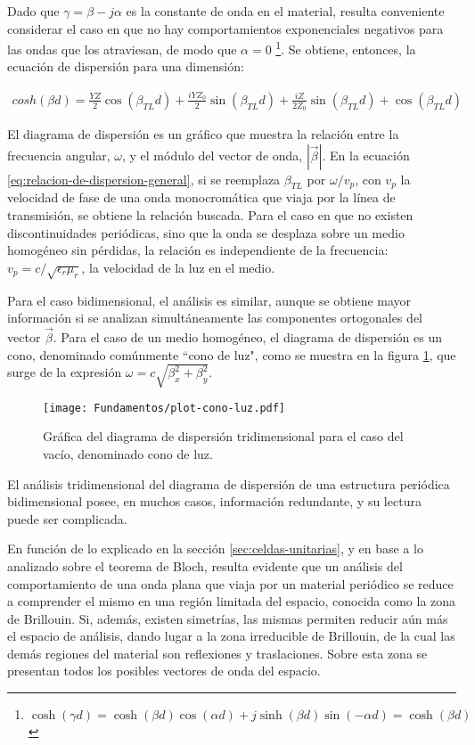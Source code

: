 Dado que $\gamma = \beta -j\alpha$ es la constante de onda en el material, resulta conveniente considerar el caso en que no hay comportamientos exponenciales negativos para las ondas que los atraviesan, de modo que $\alpha=0$ \footnote{$\cosh (\gamma d) = \cosh(\beta d)\cos(\alpha d) + j \sinh(\beta d) \sin(-\alpha d) = \cosh (\beta d)$}. Se obtiene, entonces, la ecuación de dispersión para una dimensión:

\begin{align}
	\label{eq:relacion-de-dispersion-general}
	cosh(\beta d) = \frac{Y Z}{2} \cos{\left (\beta_{TL} d \right )} + \frac{i Y Z_{0}}{2} \sin{\left (\beta_{TL} d \right )} + \frac{i Z}{2 Z_{0}} \sin{\left (\beta_{TL} d \right )} + \cos{\left (\beta_{TL} d \right )}
\end{align}

El diagrama de dispersión es un gráfico que muestra la relación entre la frecuencia angular, $\omega$, y el módulo del vector de onda, $|\vec{\beta}|$. En la ecuación \ref{eq:relacion-de-dispersion-general}, si se reemplaza $\beta_{TL}$ por $\omega/v_p$, con $v_p$ la velocidad de fase de una onda monocromática que viaja por la línea de transmisión, se obtiene la relación buscada. Para el caso en que no existen discontinuidades periódicas, sino que la onda se desplaza sobre un medio homogéneo sin pérdidas, la relación es independiente de la frecuencia: $v_p = c/\sqrt{\epsilon_r \mu_r}$, la velocidad de la luz en el medio.

Para el caso bidimensional, el análisis es similar, aunque se obtiene mayor información si se analizan simultáneamente las componentes ortogonales del vector $\vec{\beta}$. Para el caso de un medio homogéneo, el diagrama de dispersión es un cono, denominado comúnmente ``cono de luz", como se muestra en la figura \ref{fig:diagrama-dispersion-vacio-3d}, que surge de la expresión $\omega = c \sqrt{\beta_x^2 + \beta_y^2}$.

\begin{figure}[htp]
	\centering
	\texttt{[image: Fundamentos/plot-cono-luz.pdf]}
	\caption{Gráfica del diagrama de dispersión tridimensional para el caso del vacío, denominado cono de luz.}
	\label{fig:diagrama-dispersion-vacio-3d}
\end{figure}

El análisis tridimensional del diagrama de dispersión de una estructura periódica bidimensional posee, en muchos casos, información redundante, y su lectura puede ser complicada.

En función de lo explicado en la sección \ref{sec:celdas-unitarias}, y en base a lo analizado sobre el teorema de Bloch, resulta evidente que un análisis del comportamiento de una onda plana que viaja por un material periódico se reduce a comprender el mismo en una región limitada del espacio, conocida como la zona de Brillouin. Si, además, existen simetrías, las mismas permiten reducir aún más el espacio de análisis, dando lugar a la zona irreducible de Brillouin, de la cual las demás regiones del material son reflexiones y traslaciones. Sobre esta zona se presentan todos los posibles vectores de onda del espacio.

